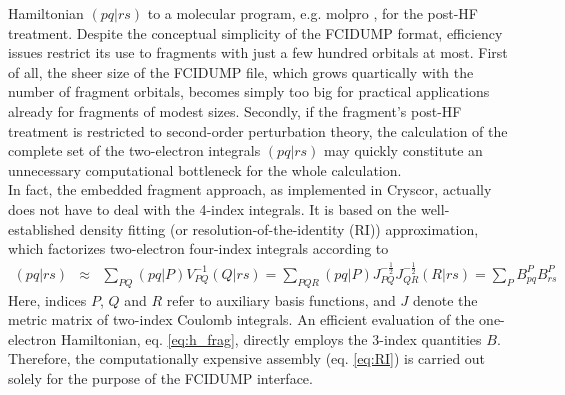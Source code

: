 \documentclass[a4paper,11pt,headings=normal]{scrartcl}
\begin{document}
Hamiltonian  $(pq|rs)$ to a molecular program, e.g. molpro \cite{molpro}, for the 
post-HF treatment.
Despite the conceptual simplicity of the FCIDUMP format, efficiency issues 
restrict its use to fragments with just a few hundred orbitals at most. First 
of all, the sheer size of the FCIDUMP file, which grows quartically with the 
number of fragment orbitals, becomes simply too big for practical applications 
already for fragments of modest sizes. Secondly, if the fragment's post-HF 
treatment is restricted to second-order perturbation theory, the calculation 
of the complete set of the two-electron integrals $(pq|rs)$ may quickly 
constitute an unnecessary computational bottleneck for the whole calculation.\\
In fact, the embedded fragment approach, as implemented in Cryscor, actually does 
not have to deal with the 4-index integrals. It is based on the well-established
density fitting (or resolution-of-the-identity (RI)) approximation, 
which factorizes two-electron four-index integrals according 
to\autocite{Feyereisen1993}  
\begin{eqnarray}
	(pq|rs) &\approx& \sum_{PQ} (pq|P) V^{-1}_{PQ} (Q|rs) 
	= \sum_{PQR} (pq|P) J^{-\frac{1}{2}}_{PQ} J^{-\frac{1}{2}}_{QR} (R|rs)= \sum_{P} B^P_{pq} B^P_{rs} \label{eq:RI}
\end{eqnarray}
Here, indices $P$, $Q$ and $R$ refer to auxiliary basis functions, and $J$ 
denote the metric matrix of two-index Coulomb integrals. An efficient 
evaluation of the one-electron Hamiltonian, eq. \eqref{eq:h_frag}, directly 
employs the 3-index quantities $B$.\autocite{Lavroff2024} 
Therefore, the 
computationally expensive assembly (eq. \eqref{eq:RI}) is carried out 
solely for the purpose of the FCIDUMP interface. 
\end{document}
